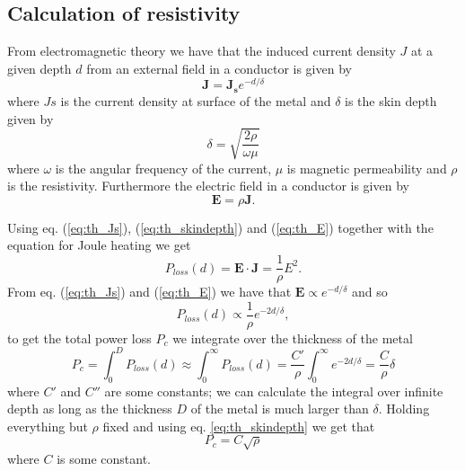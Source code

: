 \subsection{Calculation of resistivity}
From electromagnetic theory we have that the induced current density $J$ at a given depth $d$ from an external field in a conductor is given by
\begin{equation}
\mathbf{J} = \mathbf{J_s} e^{-d/\delta}
\label{eq:th_Js}
\end{equation}
where $Js$ is the current density at surface of the metal and $\delta$
is the skin depth given by
\begin{equation}
\delta = \sqrt{\frac{2\rho}{\omega \mu}}
\label{eq:th_skindepth}
\end{equation}
where $\omega$ is the angular frequency of the current, $\mu$ is magnetic permeability and
$\rho$ is the resistivity.
Furthermore the electric field in a conductor is given by
\begin{equation}
\mathbf{E} = \rho \mathbf{J}.
\label{eq:th_E}
\end{equation}

Using eq. (\ref{eq:th_Js}), (\ref{eq:th_skindepth}) and (\ref{eq:th_E}) together with the equation for Joule heating we get
\begin{equation}
P_{loss}(d) = \mathbf{E}\cdot\mathbf{J} = \frac{1}{\rho}E^2.
\end{equation}
From eq. (\ref{eq:th_Js}) and (\ref{eq:th_E}) we have that $\mathbf{E} \propto e^{-d/\delta}$ and so
\begin{equation}
P_{loss}(d) \propto \frac{1}{\rho} e^{-2d/\delta},
\end{equation}
to get the total power loss $P_c$ we integrate over the thickness of the metal
\begin{equation}
P_{c} = \int_{0}^{D} P_{loss} (d) \approx \int_{0}^{\infty} P_{loss}(d) = \frac{C'}{\rho} \int_{0}^{\infty} e^{-2d/\delta} = \frac{C}{\rho} \delta
\end{equation}
where $C'$ and $C''$ are some constants; we can calculate the integral over infinite depth as long as the thickness $D$ of the metal is much larger than $\delta$.
Holding everything but $\rho$ fixed and using eq. \ref{eq:th_skindepth} we get that
\begin{equation}
P_{c} = C \sqrt{\rho}
\label{eq:P_metal}
\end{equation}
where $C$ is some constant.

